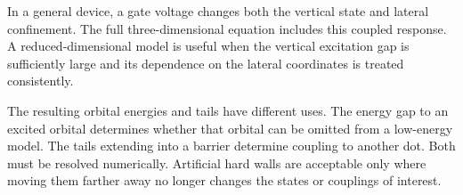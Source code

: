 In a general device, a gate voltage changes both the vertical
state and lateral confinement. The full three-dimensional
equation includes this coupled response. A reduced-dimensional
model is useful when the vertical excitation gap is sufficiently
large and its dependence on the lateral coordinates is treated
consistently.

The resulting orbital energies and tails have different uses.
The energy gap to an excited orbital determines whether that orbital
can be omitted from a low-energy model. The tails extending into a
barrier determine coupling to another dot. Both must be resolved
numerically. Artificial hard walls are acceptable only where moving
them farther away no longer changes the states or couplings of interest.
